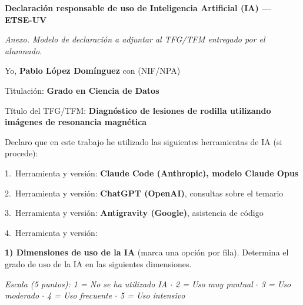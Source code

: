 \thispagestyle{empty}
\begingroup
\setlength{\parindent}{0pt}
\raggedright
\footnotesize
\newcommand{\sel}{$\boxtimes$}%
\newcommand{\non}{$\square$}%

{\large\bfseries Declaración responsable de uso de Inteligencia Artificial (IA) --- ETSE-UV\par}
\vspace{2pt}
{\itshape Anexo. Modelo de declaración a adjuntar al TFG/TFM entregado por el alumnado.\par}
\vspace{8pt}

Yo, \textbf{Pablo López Domínguez} con (NIF/NPA) \underline{\hspace{3.2cm}}\par
\vspace{3pt}
Titulación: \textbf{Grado en Ciencia de Datos}\par
\vspace{3pt}
Título del TFG/TFM: \textbf{Diagnóstico de lesiones de rodilla utilizando imágenes de resonancia magnética}\par
\vspace{6pt}

Declaro que en este trabajo he utilizado las siguientes herramientas de IA (si procede):\par
\vspace{2pt}
1.~Herramienta y versión: \textbf{Claude Code (Anthropic), modelo Claude Opus}\par
2.~Herramienta y versión: \textbf{ChatGPT (OpenAI)}, consultas sobre el temario\par
3.~Herramienta y versión: \textbf{Antigravity (Google)}, asistencia de código\par
4.~Herramienta y versión: \underline{\hspace{10cm}}\par
\vspace{8pt}

{\bfseries 1) Dimensiones de uso de la IA} (marca una opción por fila). Determina el grado de uso de la IA en las siguientes dimensiones.\par
\vspace{2pt}
{\itshape Escala (5 puntos): 1 = No se ha utilizado IA $\cdot$ 2 = Uso muy puntual $\cdot$ 3 = Uso moderado $\cdot$ 4 = Uso frecuente $\cdot$ 5 = Uso intensivo}\par
\vspace{4pt}

